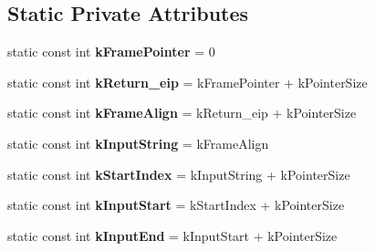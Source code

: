 \subsection*{Static Private Attributes}
\begin{DoxyCompactItemize}
\item 
static const int {\bfseries k\+Frame\+Pointer} = 0\hypertarget{classv8_1_1internal_1_1_reg_exp_macro_assembler_i_a32_a5c1bd1a0f942aeecbd2b8580eadad5ac}{}\label{classv8_1_1internal_1_1_reg_exp_macro_assembler_i_a32_a5c1bd1a0f942aeecbd2b8580eadad5ac}

\item 
static const int {\bfseries k\+Return\+\_\+eip} = k\+Frame\+Pointer + k\+Pointer\+Size\hypertarget{classv8_1_1internal_1_1_reg_exp_macro_assembler_i_a32_a61588265718e6ce80318d02df411ecb1}{}\label{classv8_1_1internal_1_1_reg_exp_macro_assembler_i_a32_a61588265718e6ce80318d02df411ecb1}

\item 
static const int {\bfseries k\+Frame\+Align} = k\+Return\+\_\+eip + k\+Pointer\+Size\hypertarget{classv8_1_1internal_1_1_reg_exp_macro_assembler_i_a32_a6066d9d78f6b15ec26ab570e7ca66ad6}{}\label{classv8_1_1internal_1_1_reg_exp_macro_assembler_i_a32_a6066d9d78f6b15ec26ab570e7ca66ad6}

\item 
static const int {\bfseries k\+Input\+String} = k\+Frame\+Align\hypertarget{classv8_1_1internal_1_1_reg_exp_macro_assembler_i_a32_a927163a5d9581e7c9ec6415b623366d3}{}\label{classv8_1_1internal_1_1_reg_exp_macro_assembler_i_a32_a927163a5d9581e7c9ec6415b623366d3}

\item 
static const int {\bfseries k\+Start\+Index} = k\+Input\+String + k\+Pointer\+Size\hypertarget{classv8_1_1internal_1_1_reg_exp_macro_assembler_i_a32_abb810c8625b781df3cbd1324dd904c95}{}\label{classv8_1_1internal_1_1_reg_exp_macro_assembler_i_a32_abb810c8625b781df3cbd1324dd904c95}

\item 
static const int {\bfseries k\+Input\+Start} = k\+Start\+Index + k\+Pointer\+Size\hypertarget{classv8_1_1internal_1_1_reg_exp_macro_assembler_i_a32_a1db978d222048cd4c0c74a40d997d7d6}{}\label{classv8_1_1internal_1_1_reg_exp_macro_assembler_i_a32_a1db978d222048cd4c0c74a40d997d7d6}

\item 
static const int {\bfseries k\+Input\+End} = k\+Input\+Start + k\+Pointer\+Size\hypertarget{classv8_1_1internal_1_1_reg_exp_macro_assembler_i_a32_a88893ba4fc3be94cfc0fe946f62eb297}{}\label{classv8_1_1internal_1_1_reg_exp_macro_assembler_i_a32_a88893ba4fc3be94cfc0fe946f62eb297}


\end{DoxyCompactItemize}
